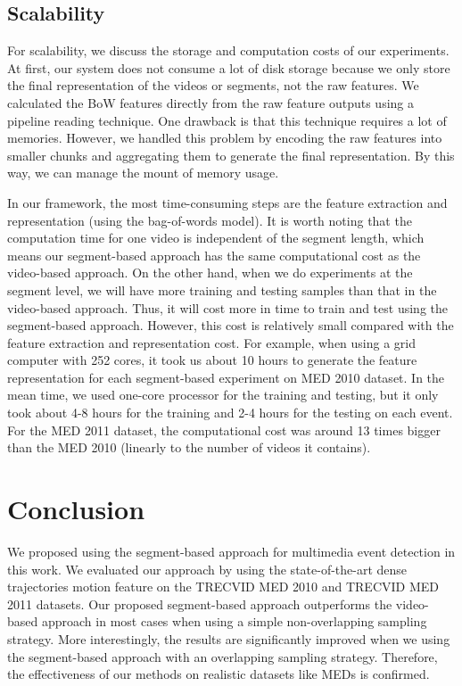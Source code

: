 \subsection{Scalability} For scalability, we discuss the storage and computation costs of our experiments. At first, our system does not consume a lot of disk storage because we only store the final representation of the videos or segments, not the raw features. We calculated the BoW features directly from the raw feature outputs using a pipeline reading technique. One drawback is that this technique requires a lot of memories. However, we handled this problem by encoding the raw features into smaller chunks and aggregating them to generate the final representation. By this way, we can manage the mount of memory usage.

In our framework, the most time-consuming steps are the feature extraction and representation (using the bag-of-words model). It is worth noting that the computation time for one video is independent of the segment length, which means our segment-based approach has the same computational cost as the video-based approach. On the other hand, when we do experiments at the segment level, we will have more training and testing samples than that in the video-based approach. Thus, it will cost more in time to train and test using the segment-based approach. However, this cost is relatively small compared with the feature extraction and representation cost. For example, when using a grid computer with 252 cores, it took us about 10 hours to generate the feature representation for each segment-based experiment on MED 2010 dataset. In the mean time, we used one-core processor for the training and testing, but it only took about 4-8 hours for the training and 2-4 hours for the testing on each event. For the MED 2011 dataset, the computational cost was around 13 times bigger than the MED 2010 (linearly to the number of videos it contains).

\section{Conclusion}
\label{c3_conclusion}
We proposed using the segment-based approach for multimedia event detection in this work. We evaluated our approach by using the state-of-the-art dense trajectories motion feature on the TRECVID MED 2010 and TRECVID MED 2011 datasets. Our proposed segment-based approach outperforms the video-based approach in most cases when using a simple non-overlapping sampling strategy. More interestingly, the results are significantly improved when we using the segment-based approach with an overlapping sampling strategy. Therefore, the effectiveness of our methods on realistic datasets like MEDs is confirmed.

